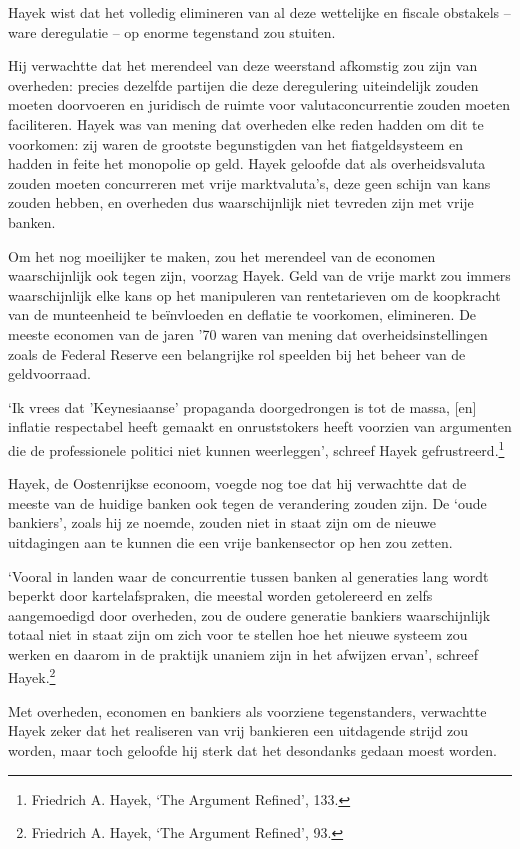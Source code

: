 \documentclass[smalldemyvopaper,11pt,twoside,onecolumn,openright,extrafontsizes,hidelinks]{memoir}
\begin{document}
Hayek wist dat het volledig elimineren van al deze wettelijke en fiscale
obstakels -- ware deregulatie -- op enorme tegenstand zou stuiten.

Hij verwachtte dat het merendeel van deze weerstand afkomstig zou zijn
van overheden: precies dezelfde partijen die deze deregulering
uiteindelijk zouden moeten doorvoeren en juridisch de ruimte voor
valutaconcurrentie zouden moeten faciliteren. Hayek was van mening dat
overheden elke reden hadden om dit te voorkomen: zij waren de grootste
begunstigden van het fiatgeldsysteem en hadden in feite het monopolie op
geld. Hayek geloofde dat als overheidsvaluta zouden moeten concurreren
met vrije marktvaluta's, deze geen schijn van kans zouden hebben, en
overheden dus waarschijnlijk niet tevreden zijn met vrije banken.

Om het nog moeilijker te maken, zou het merendeel van de economen
waarschijnlijk ook tegen zijn, voorzag Hayek. Geld van de vrije markt
zou immers waarschijnlijk elke kans op het manipuleren van rentetarieven
om de koopkracht van de munteenheid te beïnvloeden en deflatie te
voorkomen, elimineren. De meeste economen van de jaren '70 waren van
mening dat overheidsinstellingen zoals de Federal Reserve een
belangrijke rol speelden bij het beheer van de geldvoorraad.

`Ik vrees dat 'Keynesiaanse' propaganda doorgedrongen is tot de massa,
{[}en{]} inflatie respectabel heeft gemaakt en onruststokers heeft
voorzien van argumenten die de professionele politici niet kunnen
weerleggen', schreef Hayek gefrustreerd.\footnote{Friedrich A. Hayek,
  `The Argument Refined', 133.}

Hayek, de Oostenrijkse econoom, voegde nog toe dat hij verwachtte dat de
meeste van de huidige banken ook tegen de verandering zouden zijn. De
`oude bankiers', zoals hij ze noemde, zouden niet in staat zijn om de
nieuwe uitdagingen aan te kunnen die een vrije bankensector op hen zou
zetten.

`Vooral in landen waar de concurrentie tussen banken al generaties lang
wordt beperkt door kartelafspraken, die meestal worden getolereerd en
zelfs aangemoedigd door overheden, zou de oudere generatie bankiers
waarschijnlijk totaal niet in staat zijn om zich voor te stellen hoe het
nieuwe systeem zou werken en daarom in de praktijk unaniem zijn in het
afwijzen ervan', schreef Hayek.\footnote{Friedrich A. Hayek, `The
  Argument Refined', 93.}

Met overheden, economen en bankiers als voorziene tegenstanders,
verwachtte Hayek zeker dat het realiseren van vrij bankieren een
uitdagende strijd zou worden, maar toch geloofde hij sterk dat het
desondanks gedaan moest worden.
\end{document}
